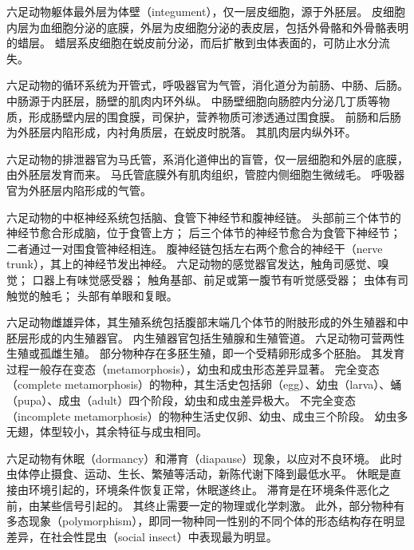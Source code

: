 \documentclass[11pt]{article}
\begin{document}
\newline

六足动物躯体最外层为体壁（integument），仅一层皮细胞，源于外胚层。
皮细胞内层为血细胞分泌的底膜，外层为皮细胞分泌的表皮层，包括外骨骼和外骨骼表明的蜡层。
蜡层系皮细胞在蜕皮前分泌，而后扩散到虫体表面的，可防止水分流失。

\newline

六足动物的循环系统为开管式，呼吸器官为气管，消化道分为前肠、中肠、后肠。
中肠源于内胚层，肠壁的肌肉内环外纵。
中肠壁细胞向肠腔内分泌几丁质等物质，形成肠壁内层的围食膜，司保护，营养物质可渗透通过围食膜。
前肠和后肠为外胚层内陷形成，内衬角质层，在蜕皮时脱落。
其肌肉层内纵外环。

\newline

六足动物的排泄器官为马氏管，系消化道伸出的盲管，仅一层细胞和外层的底膜，由外胚层发育而来。
马氏管底膜外有肌肉组织，管腔内侧细胞生微绒毛。
呼吸器官为外胚层内陷形成的气管。

\newline

六足动物的中枢神经系统包括脑、食管下神经节和腹神经链。
头部前三个体节的神经节愈合形成脑，位于食管上方；
后三个体节的神经节愈合为食管下神经节；
二者通过一对围食管神经相连。
腹神经链包括左右两个愈合的神经干（nerve trunk），其上的神经节发出神经。
六足动物的感觉器官发达，触角司感觉、嗅觉；
口器上有味觉感受器；
触角基部、前足或第一腹节有听觉感受器；
虫体有司触觉的触毛；
头部有单眼和复眼。

\newline

六足动物雌雄异体，其生殖系统包括腹部末端几个体节的附肢形成的外生殖器和中胚层形成的内生殖器官。
内生殖器官包括生殖腺和生殖管道。
六足动物可营两性生殖或孤雌生殖。
部分物种存在多胚生殖，即一个受精卵形成多个胚胎。
其发育过程一般存在变态（metamorphosis），幼虫和成虫形态差异显著。
完全变态（complete metamorphosis）的物种，其生活史包括卵（egg）、幼虫（larva）、蛹（pupa）、成虫（adult）四个阶段，幼虫和成虫差异极大。
不完全变态（incomplete metamorphosis）的物种生活史仅卵、幼虫、成虫三个阶段。
幼虫多无翅，体型较小，其余特征与成虫相同。

\newline

六足动物有休眠（dormancy）和滞育（diapause）现象，以应对不良环境。
此时虫体停止摄食、运动、生长、繁殖等活动，新陈代谢下降到最低水平。
休眠是直接由环境引起的，环境条件恢复正常，休眠遂终止。
滞育是在环境条件恶化之前，由某些信号引起的。
其终止需要一定的物理或化学刺激。
此外，部分物种有多态现象（polymorphism），即同一物种同一性别的不同个体的形态结构存在明显差异，在社会性昆虫（social insect）中表现最为明显。
\end{document}
